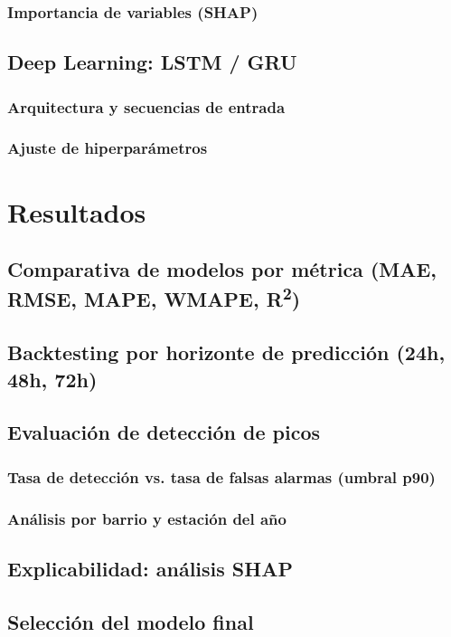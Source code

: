 \documentclass[12pt, a4paper]{article}
\begin{document}
\subsubsection{Importancia de variables (SHAP)}
\subsection{Deep Learning: LSTM / GRU}
\subsubsection{Arquitectura y secuencias de entrada}
\subsubsection{Ajuste de hiperparámetros}

\section{Resultados}

\subsection{Comparativa de modelos por métrica (MAE, RMSE, MAPE, WMAPE, R\textsuperscript{2})}
\subsection{Backtesting por horizonte de predicción (24h, 48h, 72h)}
\subsection{Evaluación de detección de picos}
\subsubsection{Tasa de detección vs. tasa de falsas alarmas (umbral p90)}
\subsubsection{Análisis por barrio y estación del año}
\subsection{Explicabilidad: análisis SHAP}
\subsection{Selección del modelo final}
\end{document}
